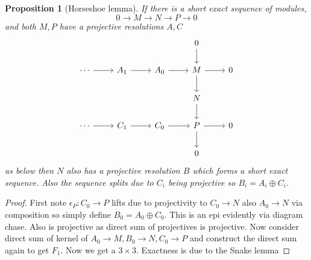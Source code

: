 \documentclass[12pt]{article}
\numberwithin{equation}{section}
\newcounter{dummy} \numberwithin{dummy}{section}
\newtheorem{proposition}[dummy]{Proposition}
\begin{document}
	\begin{proposition}[Horseshoe lemma]
		If there is a short exact sequence of modules,
		\[ 0 \to M \to N \to P \to 0 \]
		and both $M,P$ have a projective resolutions $A, C$ 
		\[\begin{tikzcd}
			&&& 0 \\
			\cdots & {A_1} & {A_0} & M & 0 \\
			&&& N \\
			\cdots & {C_1} & {C_0} & P & 0 \\
			&&& 0
			\arrow[from=2-4, to=2-5]
			\arrow[from=1-4, to=2-4]
			\arrow[from=2-4, to=3-4]
			\arrow[from=3-4, to=4-4]
			\arrow[from=4-4, to=4-5]
			\arrow[from=4-4, to=5-4]
			\arrow[ from=4-3, to=4-4]
			\arrow[ from=2-3, to=2-4]
			\arrow[from=2-1, to=2-2]
			\arrow[from=2-2, to=2-3]
			\arrow[from=4-1, to=4-2]
			\arrow[from=4-2, to=4-3]
		\end{tikzcd}\]
		as below then $N$ also has a projective resolution $B$ which forms a short exact sequence. Also the sequence splits due to $C_i$ being projective so $B_i=A_i \oplus C_i$.
	\end{proposition}
	\begin{proof}
		First note $\epsilon_P: C_0 \to P$ lifts due to projectivity to $C_0 \to N$ also $A_0\to N$ via composition so simply define $B_0 = A_0 \oplus C_0$. This is an epi evidently via diagram chase. Also is projective as direct sum of projectives is projective. Now consider direct sum of kernel of $A_0 \to M, B_0 \to N, C_0 \to P$ and construct the direct sum again to get $F_1$.	Now we get a $3\times 3$. Exactness is due to the Snake lemma
	\end{proof}
	
\end{document}
